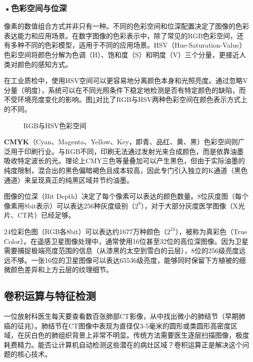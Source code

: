 \subsubsection*{\textbf{•色彩空间与位深}}

像素的数值组合方式并非只有一种。不同的色彩空间和位深配置决定了图像的色彩表达能力和应用场景。在数字图像的色彩表示中，除了常见的RGB色彩空间，还有多种不同的色彩模型，适用于不同的应用场景。HSV（Hue-Saturation-Value）色彩空间将颜色分解为色调（H）、饱和度（S）和明度（V）三个分量，更接近人类对颜色的感知方式。

在工业质检中，使用HSV空间可以更容易地分离颜色本身和光照亮度。通过忽略V分量（明度），系统可以在不同光照条件下稳定地检测是否有特定颜色的缺陷，而不受环境亮度变化的影响。图\ref{fig:ch2_2_14}对比了RGB与HSV两种色彩空间在颜色表示方式上的不同。

\begin{figure}[H]
\centering
{}
\caption{RGB与HSV色彩空间}
\label{fig:ch2_2_14}
\end{figure}

\textbf{CMYK}（Cyan、Magenta、Yellow、Key，即青、品红、黄、黑）色彩空间则广泛用于印刷行业。与RGB不同，印刷无法通过发射光来合成颜色，而是依靠油墨吸收特定波长的光。理论上CMY三色等量叠加可以产生黑色，但由于实际油墨的纯度限制，混合出的黑色偏暗褐色且成本较高，因此专门引入独立的K通道（黑色通道）来呈现真正的纯黑区域并节约油墨。

图像的位深（Bit Depth）决定了每个像素可以表达的颜色数量。8位灰度图（每个像素用8bit表示）可以表达256种灰度级别（$2^8$），对于大部分灰度医学图像（X光片、CT片）已经足够。

24位彩色图（RGB各8bit）可以表达约1677万种颜色（$2^{24}$），被称为真彩色（True Color）。在遥感卫星图像处理中，通常使用16位甚至32位的高位深图像。因为卫星需要捕捉极端亮度范围的信息（从漆黑的太空到雪白的云层），8位的256级亮度远远不够。一张16位的卫星图像可以表达65536级亮度，能够同时保留下方植被的细微颜色差异和上方云层的纹理细节。





\subsection{卷积运算与特征检测}
一位放射科医生每天要查看数百张肺部CT影像，从中找出微小的肺结节（早期肺癌的征兆）。肺结节在CT图像中表现为直径仅3-5毫米的圆形或类圆形高密度区域，在灰白色的肺组织背景上非常不明显。传统方法需要医生逐层扫描图像，极度耗费精力。能否让计算机自动检测这些潜在的病灶区域？卷积运算正是解决这个问题的核心技术。



